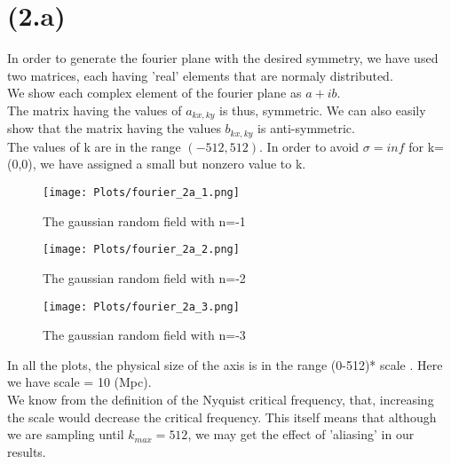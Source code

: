 \section{(2.a)}

In order to generate the fourier plane with the desired symmetry, we have used two matrices, each having 'real' elements that are normaly distributed.\\
We show each complex element of the fourier plane as $a+ib$.\\
The matrix having the values of $a_{kx,ky}$ is thus, symmetric. We can also easily show that the matrix having the values $b_{kx,ky}$ is anti-symmetric.\\
The values of k are in the range $(-512, 512)$. In order to avoid $\sigma = inf$ for k=(0,0), we have assigned a small but nonzero value to k.\\



\begin{figure}[!htb]
  \centering
  \texttt{[image: Plots/fourier\_2a\_1.png]}
  \caption{The gaussian random field with n=-1}
  \label{fig:fig5}
\end{figure}

\begin{figure}[!htb]
  \centering
  \texttt{[image: Plots/fourier\_2a\_2.png]}
  \caption{The gaussian random field with n=-2}
  \label{fig:fig6}
\end{figure}

\begin{figure}[!htb]
  \centering
  \texttt{[image: Plots/fourier\_2a\_3.png]}
  \caption{The gaussian random field with n=-3}
  \label{fig:fig7}
\end{figure}

In all the plots, the physical size of the axis is in the range (0-512)* scale . Here we have scale = 10 (Mpc).\\
We know from the definition of the Nyquist critical frequency, that, increasing the scale would decrease the critical frequency. This itself means that
 although we are sampling until $k_{max}=512$, we may get the effect of 'aliasing' in our results.
